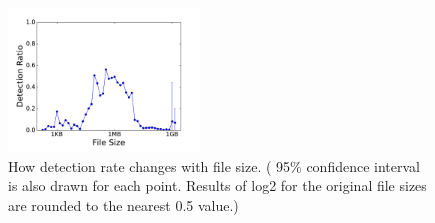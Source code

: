 \begin{figure}[t!]
\begin{center}
\includegraphics[width=2in]{figure/size}
  \caption{How detection rate changes with file size.
(
95\% confidence interval is also drawn for each point.
Results of log2 for the original file sizes are rounded to the nearest 0.5 value.)
}
\label{fig:size}
\end{center}
\end{figure}
